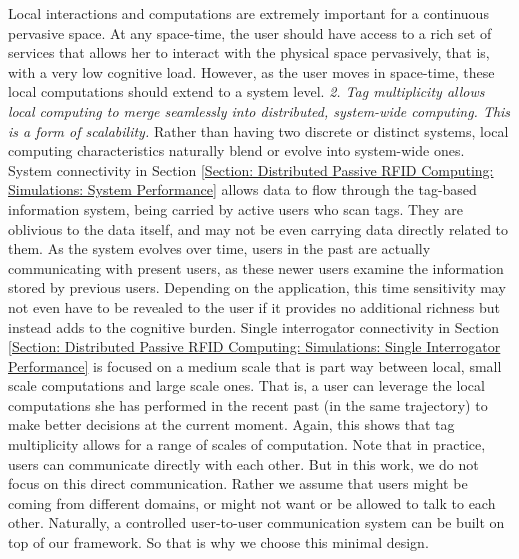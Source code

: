 Local interactions and computations are extremely important for a continuous pervasive space. At any space-time, the user should have access to a rich set of services that allows her to interact with the physical space pervasively, that is, with a very low cognitive load. However, as the user moves in space-time, these local computations should extend to a system level. \emph{2. Tag multiplicity allows local computing to merge seamlessly into distributed, system-wide computing. This is a form of scalability.} Rather than having two discrete or distinct systems, local computing characteristics naturally blend or evolve into system-wide ones. System connectivity in Section \ref{Section: Distributed Passive RFID Computing: Simulations: System Performance} allows data to flow through the tag-based information system, being carried by active users who scan tags. They are oblivious to the data itself, and may not be even carrying data directly related to them. As the system evolves over time, users in the past are actually communicating with present users, as these newer users examine the information stored by previous users. Depending on the application, this time sensitivity may not even have to be revealed to the user if it provides no additional richness but instead adds to the cognitive burden. Single interrogator connectivity in Section \ref{Section: Distributed Passive RFID Computing: Simulations: Single Interrogator Performance} is focused on a medium scale that is part way between local, small scale computations and large scale ones. That is, a user can leverage the local computations she has performed in the recent past (in the same trajectory) to make better decisions at the current moment. Again, this shows that tag multiplicity allows for a range of scales of computation. Note that in practice, users can communicate directly with each other. But in this work, we do not focus on this direct communication. Rather we assume that users might be coming from different domains, or might not want or be allowed to talk to each other. Naturally, a controlled user-to-user communication system can be built on top of our framework. So that is why we choose this minimal design.


